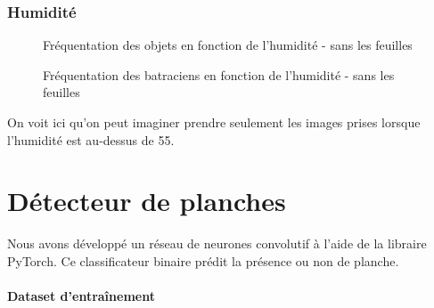 \subsubsection{Humidité}

\begin{figure}[H]
    \centering
    \caption{Fréquentation des objets en fonction de l'humidité - sans les feuilles}
    \label{fig:Fréquentation des objets en fonction de l'humidité - sans les feuilles}
\end{figure}

\begin{figure}[H]
    \centering
    \caption{Fréquentation des batraciens en fonction de l'humidité - sans les feuilles}
    \label{fig:Fréquentation des batraciens en fonction de l'humidité - sans les feuilles}
\end{figure}

On voit ici qu'on peut imaginer prendre seulement les images prises lorsque l'humidité est au-dessus de 55.


\section{Détecteur de planches}\label{sex:Planche}

Nous avons développé un réseau de neurones convolutif à l'aide de la libraire PyTorch. Ce classificateur binaire prédit la présence ou non de planche.

\paragraph*{Dataset d'entraînement}

